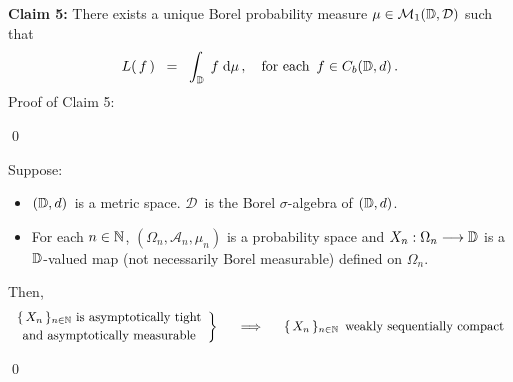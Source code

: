 \vskip 0.8cm
\noindent
\textbf{Claim 5:}\;\;
There exists a unique Borel probability measure $\mu \in \mathcal{M}_{1}(\mathbb{D},\mathcal{D})$ such that
\begin{equation*}
L(\,f\,)
\;\; = \;\;
	\int_{\mathbb{D}}\; f \;\textnormal{d}\mu\,,
\quad
\textnormal{for each \,$f \in C_{b}(\mathbb{D},d)$}\,.
\end{equation*}
\vskip 0.2cm
\noindent
Proof of Claim 5:\;\;

\qed


\vskip 1.0cm
\begin{corollary}
\mbox{}\vskip 0.1cm
\noindent
Suppose:
\begin{itemize}
\item
	$(\mathbb{D},d)$\, is a metric space.
	$\mathcal{D}$\, is the Borel $\sigma$-algebra of $(\mathbb{D},d)$.
\item
	For each $n \in \mathbb{N}$,
	$(\Omega_{n},\mathcal{A}_{n},\mu_{n})$ is a probability space and
	$X_{n} : \Omega_{n} \longrightarrow \mathbb{D}$
	is a $\mathbb{D}$-valued map (not necessarily Borel measurable) defined on $\Omega_{n}$.
\end{itemize}
Then,
\begin{equation*}
	\left.\begin{array}{c}
	\textnormal{$\{\,X_{n}\,\}_{n\in\N}$ is asymptotically tight}
	\\
	\overset{{\color{white}.}}{\textnormal{and asymptotically measurable}}
	\end{array}\right\}
\quad\;\;\Longrightarrow\quad
	\begin{array}{c}
	\textnormal{$\{\,X_{n}\,\}_{n\in\N}$\, weakly sequentially compact}
	\end{array}
\end{equation*}
\end{corollary}
\proof

\qed


\renewcommand{\theenumi}{\roman{enumi}}
\renewcommand{\labelenumi}{\textnormal{(\theenumi)}$\;\;$}


